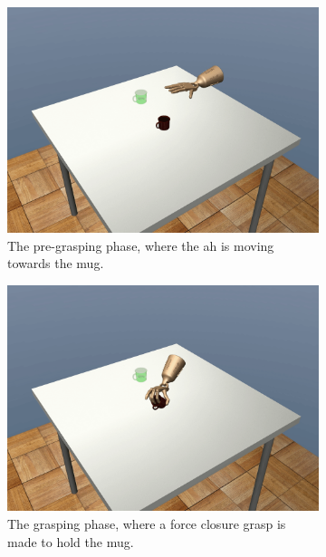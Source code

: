 \begin{figure}[!h]
	\centering
	\begin{subfigure}[b]{0.32\textwidth}
		\centering
		\includegraphics[width=\textwidth]{chapters/3-in-hand-manipulation/fig/frame_10.png}
		\caption{The pre-grasping phase, where the \gls{ah} is moving towards the mug.}
		\label{fig:ai-frame-1}
	\end{subfigure}
	\hfill
	\begin{subfigure}[b]{0.32\textwidth}
		\centering
		\includegraphics[width=\textwidth]{chapters/3-in-hand-manipulation/fig/frame_21.png}
		\caption{The grasping phase, where a force closure grasp is made to hold the mug.}
		\label{fig:ai-frame-2}
	\end{subfigure}
	\hfill
	\begin{subfigure}[b]{0.32\textwidth}

\end{subfigure}
\end{figure}
